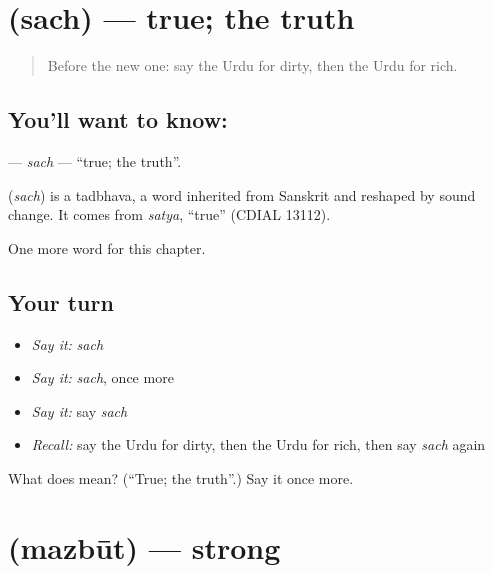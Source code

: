 \section[\texorpdfstring{\ur{سچ} (sach)}{سچ (sach)}]{ (sach) — true; the truth}

\label{lesson:UR-C132-sach}



\begin{quote}
Before the new one: say the Urdu for dirty, then the Urdu for rich.
\end{quote}

\subsection*{You'll want to know: }
\textbf{} — \emph{sach} — \textquotedblleft{}true; the truth\textquotedblright{}.

\begin{cousinweb}
\textbf{} (\emph{sach}) is a tadbhava, a word inherited from Sanskrit and reshaped by sound change. It comes from \emph{satya}, \textquotedblleft{}true\textquotedblright{} (CDIAL 13112).
\end{cousinweb}

\begin{grammarlens}[title={What you've built}]
One more word for this chapter.
\end{grammarlens}

\subsection*{Your turn}
\begin{itemize}
\raggedright
  \item \emph{Say it:} \emph{sach}
  \item \emph{Say it:} \emph{sach}, once more
  \item \emph{Say it:} say \emph{sach}
  \item \emph{Recall:} say the Urdu for dirty, then the Urdu for rich, then say \emph{sach} again
\end{itemize}

\begin{tcolorbox}[breakable,colback=teal!4,colframe=teal!35!black,title={Before you move on}]
What does  mean? (\textquotedblleft{}True; the truth\textquotedblright{}.) Say it once more.
\end{tcolorbox}
\section[\texorpdfstring{\ur{مضبوط} (mazbūt)}{مضبوط (mazbūt)}]{ (mazbūt) — strong}

